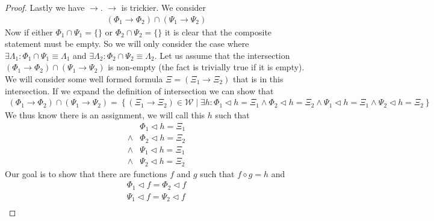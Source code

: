 \documentclass{article}
\begin{document}
\begin{proof}
Lastly we have $\rightarrow$.
$\rightarrow$ is trickier.
We consider
\begin{align*}
(\Phi_1 \rightarrow \Phi_2) \cap (\Psi_1 \rightarrow \Psi_2)
\end{align*}
Now if either $\Phi_1 \cap \Psi_1 = \{\}$ or $\Phi_2 \cap \Psi_2 = \{\}$ it is clear that the composite statement must be empty.
So we will only consider the case where $\exists \Lambda_1 : \Phi_1 \cap \Psi_1 \equiv \Lambda_1$ and $\exists \Lambda_2 : \Phi_2 \cap \Psi_2 \equiv \Lambda_2$.
Let us assume that the intersection $(\Phi_1 \rightarrow \Phi_2) \cap (\Psi_1 \rightarrow \Psi_2)$ is non-empty (the fact is trivially true if it is empty).
We will consider some well formed formula $\Xi = (\Xi_1 \rightarrow \Xi_2)$ that is in this intersection.
If we expand the definition of intersection we can show that
\begin{align*}
(\Phi_1 \rightarrow \Phi_2) \cap (\Psi_1 \rightarrow \Psi_2) = \left\{(\Xi_1\rightarrow\Xi_2)\in\mathcal{W}\mid\exists h:
      \Phi_1\lhd h=\Xi_1
\land \Phi_2\lhd h=\Xi_2
\land \Psi_1\lhd h=\Xi_1
\land \Psi_2\lhd h=\Xi_2
\right\}
\end{align*}
We thus know there is an assignment, we will call this $h$ such that
\begin{align*}
      & \Phi_1\lhd h=\Xi_1 \\
\land & \Phi_2\lhd h=\Xi_2 \\
\land & \Psi_1\lhd h=\Xi_1 \\
\land & \Psi_2\lhd h=\Xi_2
\end{align*}
Our goal is to show that there are functions $f$ and $g$ such that $f \diamond g = h$ and
\begin{align*}
\Phi_1 \lhd f = \Phi_2 \lhd f \\
\Psi_1 \lhd f = \Psi_2 \lhd f \\
\end{align*}

\end{proof}
\end{document}
